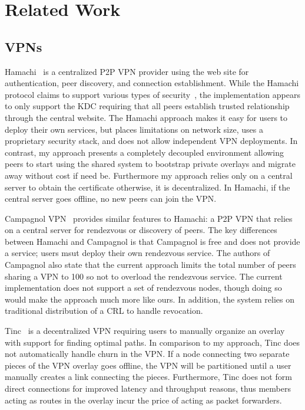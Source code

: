 \section{Related Work}
\label{vpn:related_work}

\subsection{VPNs}

Hamachi~\cite{hamachi} is a centralized P2P VPN provider using the web site for
authentication, peer discovery, and connection establishment.  While the
Hamachi protocol claims to support various types of
security~\cite{hamachi_security}, the implementation appears to only support
the KDC requiring that all peers establish trusted relationship through the
central website.  The Hamachi approach makes it easy for users to deploy their
own services, but places limitations on network size, uses a proprietary
security stack, and does not allow independent VPN deployments.  In contrast,
my approach presents a completely decoupled environment allowing peers to start
using the shared system to bootstrap private overlays and migrate away without
cost if need be.  Furthermore my approach relies only on a central server to
obtain the certificate otherwise, it is decentralized.  In Hamachi, if the
central server goes offline, no new peers can join the VPN.

Campagnol VPN~\cite{campagnol} provides similar features to Hamachi: a P2P VPN
that relies on a central server for rendezvous or discovery of peers.  The key
differences between Hamachi and Campagnol is that Campagnol is free and does
not provide a service; users msut deploy their own rendezvous service.  The
authors of Campagnol also state that the current approach limits the total
number of peers sharing a VPN to 100 so not to overload the rendezvous service.
The current implementation does not support a set of rendezvous nodes, though
doing so would make the approach much more like ours.  In addition, the system
relies on traditional distribution of a CRL to handle revocation.

Tinc~\cite{tinc} is a decentralized VPN requiring users to manually organize an
overlay with support for finding optimal paths.  In comparison to my approach,
Tinc does not automatically handle churn in the VPN.  If a node connecting two
separate pieces of the VPN overlay goes offline, the VPN will be partitioned
until a user manually creates a link connecting the pieces.  Furthermore, Tinc
does not form direct connections for improved latency and throughput reasons,
thus members acting as routes in the overlay incur the price of acting as
packet forwarders.

